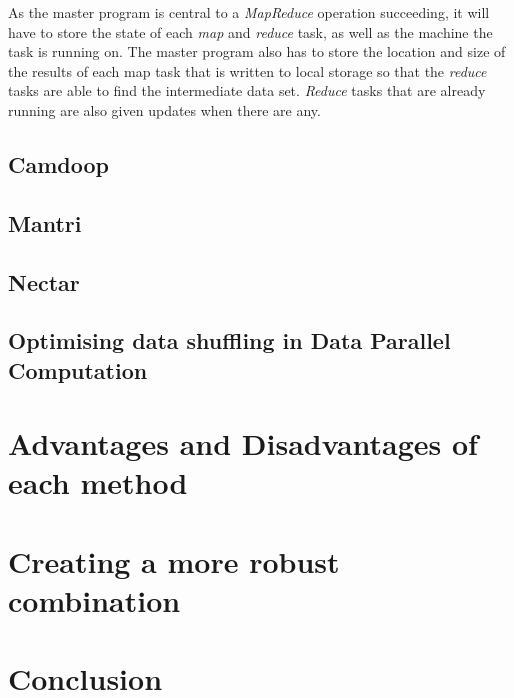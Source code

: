 \documentclass[]{article}
\begin{document}
As the master program is central to a \emph{MapReduce} operation succeeding, it will have to store the state of each \emph{map} and \emph{reduce} task, as well as the machine the task is running on. The master program also has to store the location and size of the results of each map task that is written to local storage so that the \emph{reduce} tasks are able to find the intermediate data set. \emph{Reduce} tasks that are already running are also given updates when there are any. \\





\subsection{Camdoop}

\subsection{Mantri}

\subsection{Nectar}

\subsection{Optimising data shuffling in Data Parallel Computation}

\section{Advantages and Disadvantages of each method}
\subsection{}

\subsection{}

\subsection{}

\subsection{}

\subsection{}

\section{Creating a more robust combination}

\section{Conclusion}
\end{document}
